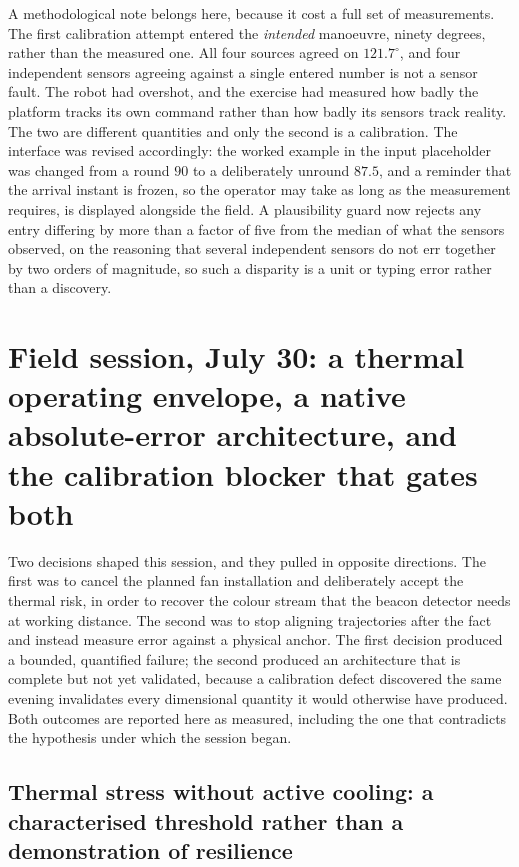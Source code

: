 A methodological note belongs here, because it cost a full set of
measurements. The first calibration attempt entered the \emph{intended}
manoeuvre, ninety degrees, rather than the measured one. All four
sources agreed on $121.7^\circ$, and four independent sensors agreeing
against a single entered number is not a sensor fault. The robot had
overshot, and the exercise had measured how badly the platform tracks its
own command rather than how badly its sensors track reality. The two are
different quantities and only the second is a calibration. The interface was
revised accordingly: the worked example in the input placeholder was changed
from a round $90$ to a deliberately unround $87.5$, and a reminder that the
arrival instant is frozen, so the operator may take as long as the
measurement requires, is displayed alongside the field. A plausibility
guard now rejects any entry differing by more than a factor of five from the
median of what the sensors observed, on the reasoning that several
independent sensors do not err together by two orders of magnitude, so such
a disparity is a unit or typing error rather than a discovery.

\section{Field session, July 30: a thermal operating envelope, a native
absolute-error architecture, and the calibration blocker that gates both}
\label{sec:july30}

Two decisions shaped this session, and they pulled in opposite directions.
The first was to cancel the planned fan installation and deliberately accept
the thermal risk, in order to recover the colour stream that the beacon
detector needs at working distance. The second was to stop aligning
trajectories after the fact and instead measure error against a physical
anchor. The first decision produced a bounded, quantified failure; the second
produced an architecture that is complete but not yet validated, because a
calibration defect discovered the same evening invalidates every dimensional
quantity it would otherwise have produced. Both outcomes are reported here as
measured, including the one that contradicts the hypothesis under which the
session began.

\subsection{Thermal stress without active cooling: a characterised threshold
rather than a demonstration of resilience}
\label{sec:july30thermal}

